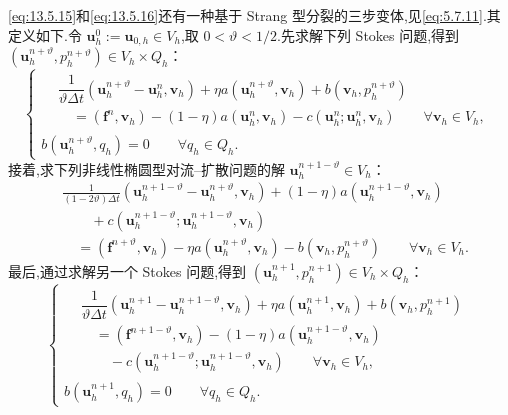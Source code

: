 \eqref{eq:13.5.15}和\eqref{eq:13.5.16}还有一种基于 Strang 型分裂的三步变体,见\eqref{eq:5.7.11}.其定义如下.令 \(\boldsymbol{u}_h^0:=\boldsymbol{u}_{0,h}\in V_h\),取 \(0<\vartheta<1/2\).先求解下列 Stokes 问题,得到 \((\boldsymbol{u}_h^{n+\vartheta},p_h^{n+\vartheta})\in V_h\times Q_h\)：
\begin{equation}\label{eq:13.5.17}
  \begin{cases}
    \begin{aligned}
      &\dfrac1{\vartheta\Delta t}(\boldsymbol{u}_h^{n+\vartheta}-\boldsymbol{u}_h^n,\boldsymbol{v}_h)
        +\eta a(\boldsymbol{u}_h^{n+\vartheta},\boldsymbol{v}_h)+b(\boldsymbol{v}_h,p_h^{n+\vartheta})\\
      &\quad=(\boldsymbol{f}^n,\boldsymbol{v}_h)-(1-\eta)a(\boldsymbol{u}_h^n,\boldsymbol{v}_h)
          -c(\boldsymbol{u}_h^n;\boldsymbol{u}_h^n,\boldsymbol{v}_h)
          \qquad\forall\boldsymbol{v}_h\in V_h,
    \end{aligned}\\[2pt]
    b(\boldsymbol{u}_h^{n+\vartheta},q_h)=0\qquad\forall q_h\in Q_h.
  \end{cases}
\end{equation}
接着,求下列非线性椭圆型对流--扩散问题的解 \(\boldsymbol{u}_h^{n+1-\vartheta}\in V_h\)：
\begin{equation}\label{eq:13.5.18}
  \begin{aligned}
    &\frac1{(1-2\vartheta)\Delta t}(\boldsymbol{u}_h^{n+1-\vartheta}-\boldsymbol{u}_h^{n+\vartheta},\boldsymbol{v}_h)
      +(1-\eta)a(\boldsymbol{u}_h^{n+1-\vartheta},\boldsymbol{v}_h)\\
    &\qquad+c(\boldsymbol{u}_h^{n+1-\vartheta};\boldsymbol{u}_h^{n+1-\vartheta},\boldsymbol{v}_h)\\
    &\quad=(\boldsymbol{f}^{n+\vartheta},\boldsymbol{v}_h)-\eta a(\boldsymbol{u}_h^{n+\vartheta},\boldsymbol{v}_h)
       -b(\boldsymbol{v}_h,p_h^{n+\vartheta})\qquad\forall\boldsymbol{v}_h\in V_h.
  \end{aligned}
\end{equation}
最后,通过求解另一个 Stokes 问题,得到 \((\boldsymbol{u}_h^{n+1},p_h^{n+1})\in V_h\times Q_h\)：
\begin{equation}\label{eq:13.5.19}
  \begin{cases}
    \begin{aligned}
      &\dfrac1{\vartheta\Delta t}(\boldsymbol{u}_h^{n+1}-\boldsymbol{u}_h^{n+1-\vartheta},\boldsymbol{v}_h)
         +\eta a(\boldsymbol{u}_h^{n+1},\boldsymbol{v}_h)+b(\boldsymbol{v}_h,p_h^{n+1})\\
      &\quad=(\boldsymbol{f}^{n+1-\vartheta},\boldsymbol{v}_h)-(1-\eta)a(\boldsymbol{u}_h^{n+1-\vartheta},\boldsymbol{v}_h)\\
      &\qquad-c(\boldsymbol{u}_h^{n+1-\vartheta};\boldsymbol{u}_h^{n+1-\vartheta},\boldsymbol{v}_h)
         \qquad\forall\boldsymbol{v}_h\in V_h,
    \end{aligned}\\[2pt]
    b(\boldsymbol{u}_h^{n+1},q_h)=0\qquad\forall q_h\in Q_h.
  \end{cases}
\end{equation}
